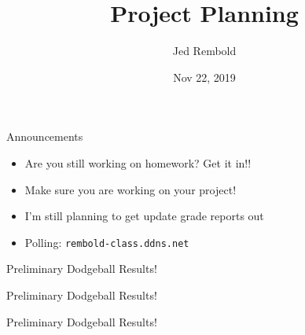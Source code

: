 \documentclass[pdf, aspectratio=169, 12pt]{beamer}
\title{Project Planning}
\author{Jed Rembold}
\date{Nov 22, 2019}
\begin{document}
\begin{frame}{Announcements}
	\begin{itemize}
		\item Are you still working on homework? Get it in!!
		\item Make sure you are working on your project!
		\item I'm still planning to get update grade reports out
		\item Polling: \nolinkurl{rembold-class.ddns.net}
	\end{itemize}
\end{frame}

\begin{frame}{Preliminary Dodgeball Results!}
	\begin{center}
	\end{center}
\end{frame}

\begin{frame}{Preliminary Dodgeball Results!}
	\begin{center}
	\end{center}
\end{frame}

\begin{frame}{Preliminary Dodgeball Results!}
	\begin{center}
	\end{center}
\end{frame}
\end{document}
